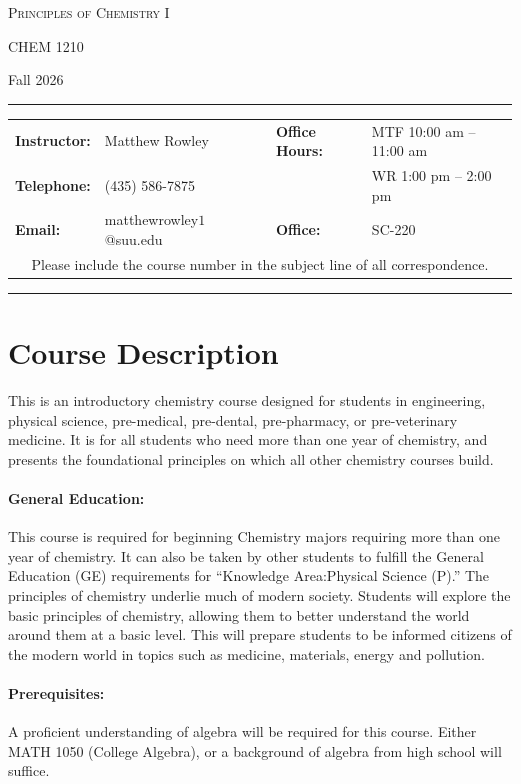 \documentclass[12pt, letterpaper]{article}
\begin{document}
\begin{center}
	{\Large \textsc{Principles of Chemistry I}}

	CHEM 1210
\end{center}

\begin{center}
	{\large Fall 2026}
\end{center}
\begin{center}
	\rule{0.99\textwidth}{0.4pt}
	\begin{tabular}{llcll}
		\textbf{Instructor:} & Matthew Rowley           &  & \textbf{Office Hours:} & MTF 10:00 am -- 11:00 am \\
		\textbf{Telephone:}  & (435) 586-7875           &  &                        & WR 1:00 pm -- 2:00 pm    \\
		\textbf{Email:}      & matthewrowley$1$@suu.edu &  & \textbf{Office:}       & SC-220                   \\
		\multicolumn{5}{c}{Please include the course number in the subject line of all correspondence.}
	\end{tabular}
	\rule{0.99\textwidth}{0.4pt}
\end{center}

\section*{Course Description}
This is an introductory chemistry course designed for students in engineering, physical science, pre-medical, pre-dental, pre-pharmacy, or pre-veterinary medicine. It is for all students who need more than one year of chemistry, and presents the foundational principles on which all other chemistry courses build.

\paragraph{General Education:}
This course is required for beginning Chemistry majors requiring more than one year of chemistry. It can also be taken by other students to fulfill the General Education (GE) requirements for ``Knowledge Area:Physical Science (P).'' The principles of chemistry underlie much of modern society. Students will explore the basic principles of chemistry, allowing them to better understand the world around them at a basic level. This will prepare students to be informed citizens of the modern world in topics such as medicine, materials, energy and pollution.

\paragraph{Prerequisites:}
A proficient understanding of algebra will be required for this course. Either MATH 1050 (College Algebra), or a background of algebra from high school will suffice.
\end{document}
